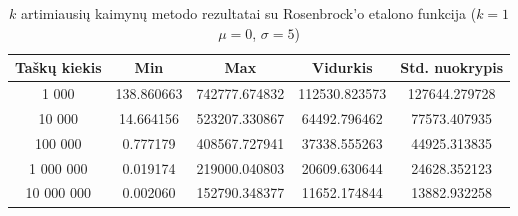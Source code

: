 \begin{table}[H]
    \centering
    \begin{tabular}{|c|c|c|c|c|}
        \hline
        \textbf{Taškų kiekis} & \textbf{Min} & \textbf{Max} & \textbf{Vidurkis} & \textbf{Std. nuokrypis} \\ \hline
        1 000        & 138.860663 & 742777.674832 & 112530.823573 & 127644.279728 \\ \hline
        10 000       & 14.664156 & 523207.330867 & 64492.796462 & 77573.407935 \\ \hline
        100 000      & 0.777179 & 408567.727941 & 37338.555263 & 44925.313835 \\ \hline
        1 000 000    & 0.019174 & 219000.040803 & 20609.630644 & 24628.352123 \\ \hline
        10 000 000   & 0.002060 & 152790.348377 & 11652.174844 & 13882.932258 \\ \hline
    \end{tabular}
    \caption{$k$ artimiausių kaimynų metodo rezultatai su Rosenbrock'o etalono funkcija ($k = 1$ $\mu = 0$, $\sigma = 5$)}
\end{table}